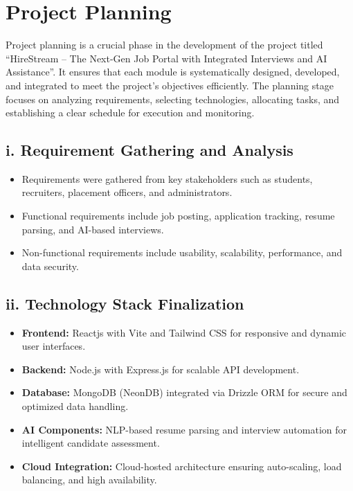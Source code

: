 \documentclass[a4paper, 12pt]{report}
\begin{document}
\section{Project Planning}

Project planning is a crucial phase in the development of the project titled 
“HireStream – The Next-Gen Job Portal with Integrated Interviews and AI Assistance”. 
It ensures that each module is systematically designed, developed, and integrated 
to meet the project’s objectives efficiently. The planning stage focuses on analyzing 
requirements, selecting technologies, allocating tasks, and establishing a clear 
schedule for execution and monitoring.

\subsection*{i. Requirement Gathering and Analysis}
\begin{itemize}[itemsep=-4pt]
    \item Requirements were gathered from key stakeholders such as students, recruiters, placement officers, and administrators.
    \item Functional requirements include job posting, application tracking, resume parsing, and AI-based interviews.
    \item Non-functional requirements include usability, scalability, performance, and data security.
\end{itemize}

\subsection*{ii. Technology Stack Finalization}
\begin{itemize}[itemsep=-4pt]
    \item \textbf{Frontend:} Reactjs with Vite and Tailwind CSS for responsive and dynamic user interfaces.
    \item \textbf{Backend:} Node.js with Express.js for scalable API development.
    \item \textbf{Database:} MongoDB (NeonDB) integrated via Drizzle ORM for secure and optimized data handling.
    \item \textbf{AI Components:} NLP-based resume parsing and interview automation for intelligent candidate assessment.
    \item \textbf{Cloud Integration:} Cloud-hosted architecture ensuring auto-scaling, load balancing, and high availability.
\end{itemize}
\end{document}
